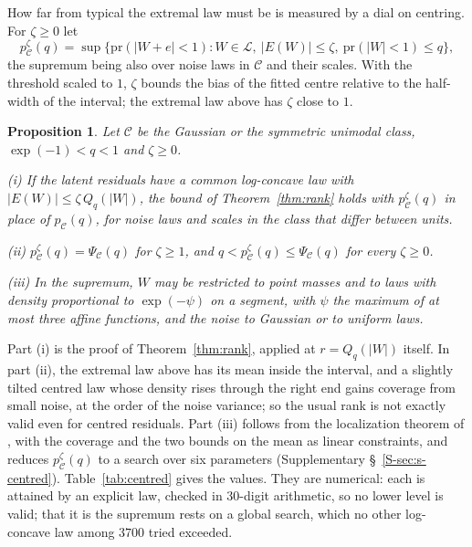 \documentclass[12pt]{article}
\newtheorem{proposition}{Proposition}
\theoremstyle{definition}
\newcommand{\pr}{\mathrm{pr}}
\newcommand{\LC}{\mathcal{L}}
\newcommand{\E}{\mathcal{C}}
\begin{document}
How far from typical the extremal law must be is measured by a dial on centring. For $\zeta \ge 0$ let
\[
p^\zeta_{\E}(q) = \sup\{\pr(|W + e| < 1) : W \in \LC,\ |E(W)| \le \zeta,\ \pr(|W| < 1) \le q\},
\]
the supremum being also over noise laws in $\E$ and their scales. With the threshold scaled to $1$, $\zeta$ bounds the bias of the fitted centre relative to the half-width of the interval; the extremal law above has $\zeta$ close to $1$.

\begin{proposition}\label{prop:centred}
Let $\E$ be the Gaussian or the symmetric unimodal class, $\exp(-1) < q < 1$ and $\zeta \ge 0$.
\par\noindent (i) If the latent residuals have a common log-concave law with $|E(W)| \le \zeta\,Q_q(|W|)$, the bound of Theorem~\ref{thm:rank} holds with $p^\zeta_{\E}(q)$ in place of $p_{\E}(q)$, for noise laws and scales in the class that differ between units.
\par\noindent (ii) $p^\zeta_{\E}(q) = \Psi_{\E}(q)$ for $\zeta \ge 1$, and $q < p^\zeta_{\E}(q) \le \Psi_{\E}(q)$ for every $\zeta \ge 0$.
\par\noindent (iii) In the supremum, $W$ may be restricted to point masses and to laws with density proportional to $\exp(-\psi)$ on a segment, with $\psi$ the maximum of at most three affine functions, and the noise to Gaussian or to uniform laws.
\end{proposition}

Part (i) is the proof of Theorem~\ref{thm:rank}, applied at $r = Q_q(|W|)$ itself. In part (ii), the extremal law above has its mean inside the interval, and a slightly tilted centred law whose density rises through the right end gains coverage from small noise, at the order of the noise variance; so the usual rank is not exactly valid even for centred residuals. Part (iii) follows from the localization theorem of \citet{fradelizi2006}, with the coverage and the two bounds on the mean as linear constraints, and reduces $p^\zeta_{\E}(q)$ to a search over six parameters (Supplementary \S~\ref{S-sec:s-centred}). Table~\ref{tab:centred} gives the values. They are numerical: each is attained by an explicit law, checked in $30$-digit arithmetic, so no lower level is valid; that it is the supremum rests on a global search, which no other log-concave law among $3700$ tried exceeded.
\end{document}
